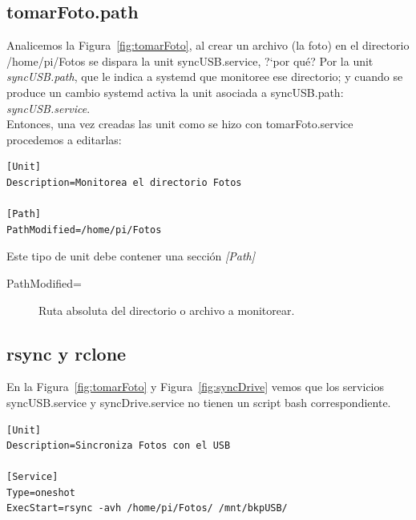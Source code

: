 \documentclass[10pt,a4paper]{article}
\newenvironment{unitFrame}[1][]{%
    \begin{mdframed}[%
        frametitle={#1},
        skipabove=\baselineskip plus 2pt minus 1pt,
        skipbelow=\baselineskip plus 2pt minus 1pt,
        linewidth=0.5pt,
        frametitlerule=true,
        frametitlebackgroundcolor=gray!10
    ]%
}{%
    \end{mdframed}
}
\begin{document}
\subsection{tomarFoto.path}

Analicemos la Figura~\ref{fig:tomarFoto}, al crear un archivo (la foto) en el directorio /home/pi/Fotos se dispara la unit syncUSB.service, ?`por qu\'e? Por la unit \emph{syncUSB.path}, que le indica a systemd que monitoree ese directorio; y cuando se produce un cambio systemd activa la unit asociada a syncUSB.path: \emph{syncUSB.service}.\\

Entonces, una vez creadas las unit como se hizo con tomarFoto.service procedemos a editarlas:

\begin{scriptsize}
\begin{unitFrame}[/etc/systemd/system/syncUSB.path]
\begin{verbatim}
[Unit]
Description=Monitorea el directorio Fotos

[Path]
PathModified=/home/pi/Fotos
\end{verbatim}
\end{unitFrame}
\end{scriptsize}

Este tipo de unit debe contener una secci\'on \emph{[Path]}

\begin{description}
    \item [PathModified=] Ruta absoluta del directorio o archivo a monitorear.
\end{description}

\subsection{rsync y rclone}

En la Figura~\ref{fig:tomarFoto} y Figura~\ref{fig:syncDrive} vemos que los servicios syncUSB.service y syncDrive.service no tienen un script bash correspondiente.

\begin{scriptsize}
\begin{unitFrame}[/etc/systemd/system/syncUSB.service]
\begin{verbatim}
[Unit]
Description=Sincroniza Fotos con el USB

[Service]
Type=oneshot
ExecStart=rsync -avh /home/pi/Fotos/ /mnt/bkpUSB/
\end{verbatim}
\end{unitFrame}
\end{scriptsize}
\end{document}
